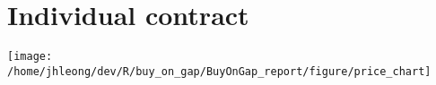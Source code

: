 \documentclass{tufte-handout}\usepackage[]{graphicx}\usepackage[]{color}
\makeatletter
\def\maxwidth{ %
  \ifdim\Gin@nat@width>\linewidth
    \linewidth
  \else
    \Gin@nat@width
  \fi
}
\newenvironment{kframe}{%
 \def\at@end@of@kframe{}%
 \ifinner\ifhmode%
  \def\at@end@of@kframe{\end{minipage}}%
  \begin{minipage}{\columnwidth}%
 \fi\fi%
 \def\FrameCommand##1{\hskip\@totalleftmargin \hskip-\fboxsep
 \colorbox{shadecolor}{##1}\hskip-\fboxsep
     \hskip-\linewidth \hskip-\@totalleftmargin \hskip\columnwidth}%
 \MakeFramed {\advance\hsize-\width
   \@totalleftmargin\z@ \linewidth\hsize
   \@setminipage}}%
 {\par\unskip\endMakeFramed%
 \at@end@of@kframe}
\newenvironment{knitrout}{}{} %
\makeatother
\begin{document}

\newpage
\section{Individual contract}
\begin{fullwidth}
\begin{knitrout}
\color{fgcolor}\begin{kframe}


{\ttfamily\noindent\bfseries\color{errorcolor}{\#\# Error: chartSeries requires an xtsible object}}\end{kframe}
\texttt{[image: /home/jhleong/dev/R/buy\_on\_gap/BuyOnGap\_report/figure/price\_chart]} 

\end{knitrout}


\end{fullwidth}
\end{document}
